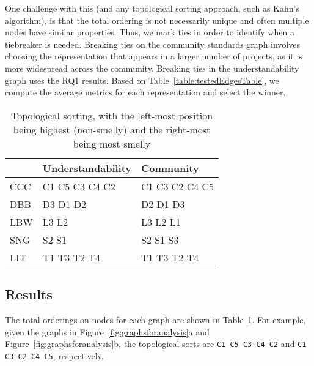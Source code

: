 One challenge with this (and any topological sorting approach, such as Kahn's algorithm), is that the total ordering is not necessarily unique and often multiple nodes have similar properties.
Thus, we mark ties in order to identify when a tiebreaker is needed.
Breaking ties on the community standards graph involves choosing the representation that appears in a larger number of projects, as it is more widespread across the community.
Breaking ties in the understandability graph uses the RQ1 results. Based on Table~\ref{table:testedEdgesTable}, we compute the average metrics for each representation and select the winner.

\begin{table}
\centering
\caption{Topological sorting, with the left-most position being highest (non-smelly) and the right-most being most smelly \label{topologicalResults} }
\vspace{-3pt}
\begin{tabular}{| l | l | l |}  \hline
& Understandability & Community  \\ \hline
CCC & C1 C5 C3 C4 C2  &   C1 C3 C2 C4 C5  \\
DBB & D3 D1 D2  &   D2 D1 D3\\
 LBW & L3 L2	 &  L3 L2 L1 	\\
 SNG &  S2 S1 &  S2 S1 S3 \\
 LIT & T1 T3 T2 T4 & T1 T3 T2 T4 \\
\hline
\end{tabular}
\vspace{-6pt}
\vspace{-6pt}
\end{table}


\subsection{Results}
The total orderings on nodes for each graph are shown in Table~\ref{topologicalResults}. For example, given the graphs in Figure~\ref{fig:graphsforanalysis}a and Figure~\ref{fig:graphsforanalysis}b, the topological sorts are {\tt C1 C5 C3 C4 C2} and {\tt C1 C3 C2 C4 C5}, respectively.



